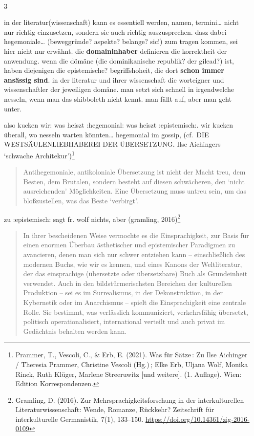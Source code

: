 \documentclass[
  letterpaper,
  DIV=11,
  numbers=noendperiod]{scrartcl}
\makeatletter
\let\oldparagraph\paragraph
\renewcommand{\paragraph}{
    \@ifstar
      \xxxParagraphStar
      \xxxParagraphNoStar
  }
\newcommand{\xxxParagraphStar}[1]{\oldparagraph*{#1}\mbox{}}
\newcommand{\xxxParagraphNoStar}[1]{\oldparagraph{#1}\mbox{}}
\makeatother
\begin{document}
\paragraph{3}\label{section-2}

in der literatur(wissenschaft) kann es essentiell werden, namen,
termini\ldots{} nicht nur richtig einzusetzen, sondern sie auch richtig
auszusprechen. dasz dabei hegemoniale\ldots{} (beweggründe? aspekte?
belange? sic!) zum tragen kommen, sei hier nicht nur erwähnt. die
\textbf{domaininhaber} definieren die korrektheit der anwendung. wenn
die dömäne (die dominikanische republik? der gilead?) ist, haben
diejenigen die epistemische? begriffshoheit, die dort \textbf{schon
immer ansässig sind}. in der literatur und ihrer wissenschaft die
worteigner und wissenschaftler der jeweiligen domäne. man setzt sich
schnell in irgendwelche nesseln, wenn man das shibboleth nicht kennt.
man fällt auf, aber man geht unter.

also kucken wir: was heiszt :hegemonial: was heiszt :epistemisch:. wir
kucken überall, wo nesseln warten könnten\ldots{} hegemonial im gossip,
(cf.~DIE WESTSÄULENLIEBHABEREI DER ÜBERSETZUNG. Ilse Aichingers
`schwache Architekur')\footnote{Prammer, T., Vescoli, C., \& Erb, E.
  (2021). Was für Sätze\,: Zu Ilse Aichinger / Theresia Prammer,
  Christine Vescoli (Hg.)\,; Elke Erb, Uljana Wolf, Monika Rinck, Ruth
  Klüger, Marlene Streeruwitz {[}und weitere{]}. (1. Auflage). Wien:
  Edition Korrespondenzen.}

\begin{quote}
Antihegemoniale, antikoloniale Übersetzung ist nicht der Macht treu, dem
Besten, dem Brutalen, sondern besteht auf diesen schwächeren, den `nicht
ausreichenden' Möglichkeiten. Eine Übersetzung muss untreu sein, um das
bloßzustellen, was das Beste `verbirgt'.
\end{quote}

zu :epistemisch: sagt fr. wolf nichts, aber (gramling, 2016)\footnote{Gramling,
  D. (2016). Zur Mehrsprachigkeitsforschung in der interkulturellen
  Literaturwissenschaft: Wende, Romanze, Rückkehr? Zeitschrift für
  interkulturelle Germanistik, 7(1), 133--150.
  \url{https://doi.org/10.14361/zig-2016-0109}}

\begin{quote}
In ihrer bescheidenen Weise vermochte es die Einsprachigkeit, zur Basis
für einen enormen Überbau ästhetischer und epistemischer Paradigmen zu
avancieren, denen man sich nur schwer entziehen kann -- einschließlich
des modernen Buchs, wie wir es kennen, und eines Kanons der
Weltliteratur, der das einsprachige (übersetzte oder übersetzbare) Buch
als Grundeinheit verwendet. Auch in den bildstürmerischsten Bereichen
der kulturellen Produktion -- sei es im Surrealismus, in der
Dekonstruktion, in der Kybernetik oder im Anarchismus -- spielt die
Einsprachigkeit eine zentrale Rolle. Sie bestimmt, was verlässlich
kommuniziert, verkehrsfähig übersetzt, politisch operationalisiert,
international verteilt und auch privat im Gedächtnis behalten werden
kann.
\end{quote}
\end{document}
